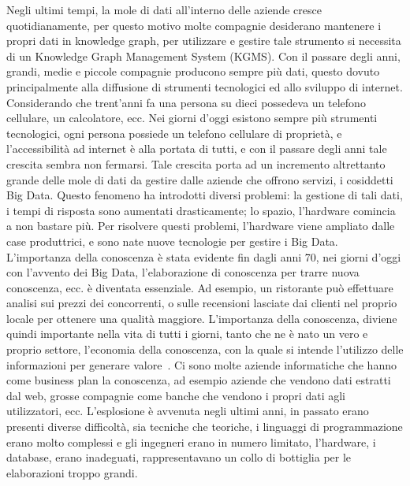 Negli ultimi tempi, la mole di dati all'interno delle aziende cresce quotidianamente, per questo motivo molte compagnie desiderano mantenere i propri dati in knowledge graph, per utilizzare e gestire tale strumento si necessita di un Knowledge Graph Management System (KGMS). \newline
Con il passare degli anni, grandi, medie e piccole compagnie producono sempre più dati, questo dovuto principalmente alla diffusione di strumenti tecnologici ed allo sviluppo di internet. Considerando che trent'anni fa una persona su dieci possedeva un telefono cellulare, un calcolatore, ecc. \newline
Nei giorni d'oggi esistono sempre più strumenti tecnologici, ogni persona possiede un telefono cellulare di proprietà, e l'accessibilità ad internet è alla portata di tutti, e con il passare degli anni tale crescita sembra non fermarsi. \newline
Tale crescita porta ad un incremento altrettanto grande delle mole di dati da gestire dalle aziende che offrono servizi, i cosiddetti Big Data. Questo fenomeno ha introdotti diversi problemi: la gestione di tali dati, i tempi di risposta sono aumentati drasticamente; lo spazio, l'hardware comincia a non bastare più. Per risolvere questi problemi, l'hardware viene ampliato dalle case produttrici, e sono nate nuove tecnologie per gestire i Big Data. \newline
L'importanza della conoscenza è stata evidente fin dagli anni 70, nei giorni d'oggi con l'avvento dei Big Data, l'elaborazione di conoscenza per trarre nuova conoscenza, ecc. è diventata essenziale. Ad esempio,  un ristorante può effettuare analisi sui prezzi dei concorrenti, o sulle recensioni lasciate dai clienti nel proprio locale per ottenere una qualità maggiore. \newline
L'importanza della conoscenza, diviene quindi importante nella vita di tutti i giorni, tanto che ne è nato un vero e proprio settore, l'economia della conoscenza, con la quale si intende l'utilizzo delle informazioni per generare valore~\cite{ecokn}. Ci sono molte aziende informatiche che hanno come business plan la conoscenza, ad esempio aziende che vendono dati estratti dal web, grosse compagnie come banche che vendono i propri dati agli utilizzatori, ecc. \newline
L'esplosione è avvenuta negli ultimi anni, in passato erano presenti diverse difficoltà, sia tecniche che teoriche, i linguaggi di programmazione erano molto complessi e gli ingegneri erano in numero limitato, l'hardware, i database, erano inadeguati, rappresentavano un collo di bottiglia per le elaborazioni troppo grandi. \newline
